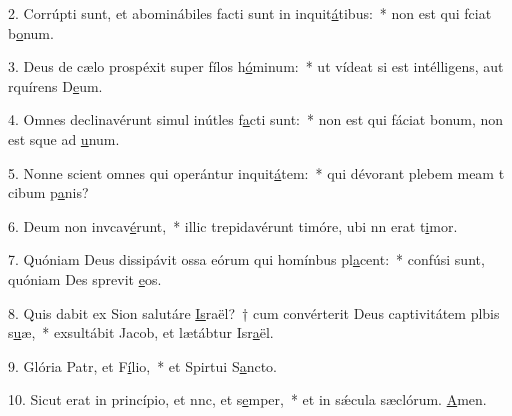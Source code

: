 2. Corrúpti sunt, et abominábiles facti sunt in inquit\uline{á}tibus:~* non est qui fciat b\uline{o}num.\par 
3. Deus de cælo prospéxit super fílos h\uline{ó}minum:~* ut vídeat si est intélligens, aut rquírens D\uline{e}um.\par 
4. Omnes declinavérunt simul inútles f\uline{a}cti sunt:~* non est qui fáciat bonum, non est sque ad \uline{u}num.\par 
5. Nonne scient omnes qui operántur inquit\uline{á}tem:~* qui dévorant plebem meam t cibum p\uline{a}nis?\par 
6. Deum non invcav\uline{é}runt,~* illic trepidavérunt timóre, ubi nn erat t\uline{i}mor.\par 
7. Quóniam Deus dissipávit ossa eórum qui homínbus pl\uline{a}cent:~* confúsi sunt, quóniam Des sprevit \uline{e}os.\par 
8. Quis dabit ex Sion salutáre \uline{Is}raël?~† cum convérterit Deus captivitátem plbis s\uline{u}æ,~* exsultábit Jacob, et lætábtur Isr\uline{a}ël.\par 
9. Glória Patr, et F\uline{í}lio,~* et Spirtui S\uline{a}ncto.\par 
10. Sicut erat in princípio, et nnc, et s\uline{e}mper,~* et in sǽcula sæclórum. \uline{A}men.\par 
